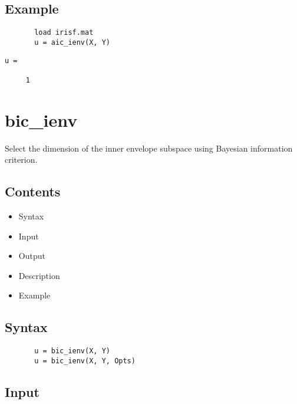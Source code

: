 \documentclass[a4paper,11pt,openany]{memoir}
\begin{document}
\subsection*{Example}


\begin{verbatim}       load irisf.mat
       u = aic_ienv(X, Y)\end{verbatim}
    
        \color{lightgray}\ttfamily \begin{verbatim}
u =

     1

\end{verbatim} \rmfamily
\color{black}

\newpage

\rmfamily
\color{black}\section{bic\_ienv}

\begin{par}
Select the dimension of the inner envelope subspace using Bayesian information criterion.
\end{par} \vspace{1em}

\subsection*{Contents}

\begin{itemize}
\setlength{\itemsep}{-1ex}
   \item Syntax
   \item Input
   \item Output
   \item Description
   \item Example
\end{itemize}


\subsection*{Syntax}


\begin{verbatim}       u = bic_ienv(X, Y)
       u = bic_ienv(X, Y, Opts)\end{verbatim}
    

\subsection*{Input}
\end{document}
